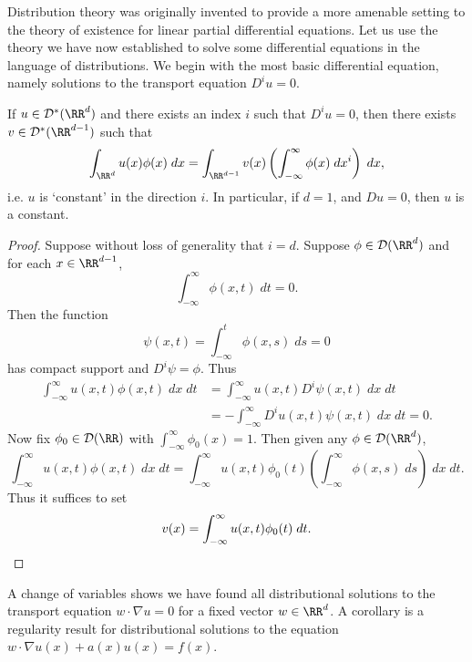 Distribution theory was originally invented to provide a more amenable setting to the theory of existence for linear partial differential equations. Let us use the theory we have now established to solve some differential equations in the language of distributions. We begin with the most basic differential equation, namely solutions to the transport equation $D^i u = 0$.

\begin{theorem}
  If $u \in \mathcal{D}^*(\RR^d)$ and there exists an index $i$ such that $D^i u = 0$, then there exists $v \in \mathcal{D}^*(\RR^{d-1})$ such that
  \[ \int_{\RR^d} u(x) \phi(x)\; dx = \int_{\RR^{d-1}} v(x) \left( \int_{-\infty}^\infty \phi(x)\; dx^i \right)\; dx, \]
  i.e. $u$ is `constant' in the direction $i$. In particular, if $d = 1$, and $D u = 0$, then $u$ is a constant.
\end{theorem}
\begin{proof}
  Suppose without loss of generality that $i = d$. Suppose $\phi \in \mathcal{D}(\RR^d)$ and for each $x \in \RR^{d-1}$,
  \[ \int_{-\infty}^\infty \phi(x,t)\; dt = 0. \]
  Then the function
  \[ \psi(x,t) = \int_{-\infty}^t \phi(x,s)\; ds = 0 \]
  has compact support and $D^i \psi = \phi$. Thus
  \begin{align*}
    \int_{-\infty}^\infty u(x,t) \phi(x,t)\; dx\; dt &= \int_{-\infty}^\infty u(x,t) D^i \psi(x,t)\; dx\; dt\\
    &= - \int_{-\infty}^\infty D^i u(x,t) \psi(x,t)\; dx\; dt = 0.
  \end{align*}
  Now fix $\phi_0 \in \mathcal{D}(\RR)$ with $\int_{-\infty}^\infty \phi_0(x) = 1$. Then given any $\phi \in \mathcal{D}(\RR^d)$,
  \[ \int_{-\infty}^\infty u(x,t) \phi(x,t)\; dx\; dt = \int_{-\infty}^\infty u(x,t) \phi_0(t) \left( \int_{-\infty}^\infty \phi(x,s)\; ds \right)\; dx\; dt. \]
  Thus it suffices to set
  \[ v(x) = \int_{-\infty}^\infty u(x,t) \phi_0(t)\; dt. \qedhere \]
\end{proof}

A change of variables shows we have found all distributional solutions to the transport equation $w \cdot \nabla u = 0$ for a fixed vector $w \in \RR^d$. A corollary is a regularity result for distributional solutions to the equation $w \cdot \nabla u(x) + a(x) u(x) = f(x)$.


